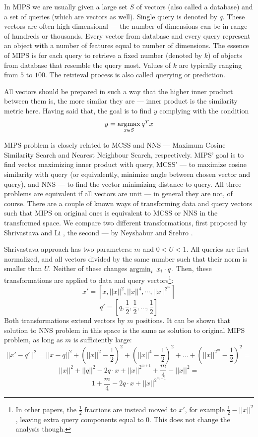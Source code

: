 In MIPS we are usually given a large set $S$ of vectors (also called a database) and a set of queries
(which are vectors as well). Single query is denoted by $q$.
These vectors are often high dimensional --- the number of dimensions can be in range of hundreds or thousands.
Every vector from database and every query represent an object with a number of features equal to number of dimensions.
The essence of MIPS is for each query to retrieve a fixed number (denoted by $k$)
of objects from database that resemble the query most.
Values of $k$ are typically ranging from $5$ to $100$.
The retrieval process is also called querying or prediction.

All vectors should be prepared in such a way that the higher inner product between them is, the more similar they are
 --- inner product is the similarity metric here. Having said that, the goal is to find $y$ complying with the condition
\[ y = \operatorname*{argmax}_{x \in S} q^T x \]

MIPS problem is closely related to MCSS and NNS --- Maximum Cosine
Similarity Search and Nearest Neighbour Search, respectively.
MIPS' goal is to find vector maximizing inner product with query,
MCSS' --- to maximize cosine similarity with query (or equivalently,
minimize angle between chosen vector and query), and NNS --- to find
the vector minimizing distance to query. All three problems are
equivalent if all vectors are unit --- in general they are not, of course.
There are a couple of known ways
of transforming data and query vectors such that MIPS on original ones
is equivalent to MCSS or NNS in the transformed space. We compare two different
transformations, first proposed by Shrivastava and Li \cite{alsh}, the second --- by
Neyshabur and Srebro \cite{neyshabur}.

Shrivastava approach has two parameters: $m$ and $0 < U < 1$. All queries
are first normalized, and all vectors divided by the same number such that
their norm is smaller than $U$. Neither of these changes
$ \operatorname*{argmin}_{i}\ x_i \cdot q$. Then, these transformations are applied to data
and query vectors\footnote{In other papers, the $\frac{1}{2}$ fractions are
instead moved to $x'$, for example $\frac{1}{2} - ||x||^2$, leaving extra
query components equal to 0. This does not change the analysis though.}:
$$
x' = [x, ||x||^2, ||x||^4, \cdots, ||x||^{2^m}]
$$
$$
q' = [q, \frac{1}{2}, \frac{1}{2}, \dots, \frac{1}{2}]
$$
Both transformations extend vectors by $m$ positions. It can be shown that
solution to NNS problem in this space is the same as solution to original
MIPS problem, as long as $m$ is sufficiently large:
$$
||x' - q'||^2 = ||x - q||^2 +
(||x||^2 - \frac{1}{2})^2 + (||x||^4 - \frac{1}{2})^2 + \dots + 
(||x||^{2^m} - \frac{1}{2})^2 =
$$
$$
||x||^2 + ||q||^2 - 2 q \cdot x
+ ||x||^{2^{m+1}} + \frac{m}{4} - ||x||^2 =
$$
$$
1 + \frac{m}{4} - 2 q \cdot x + ||x||^{2^{m+1}}
$$

